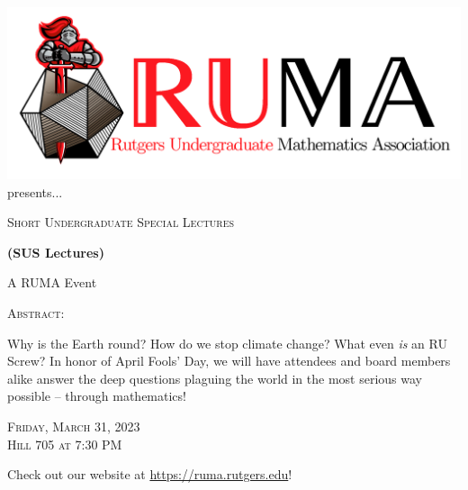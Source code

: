 \documentclass[12pt]{article}
\begin{document}

\begin{center}\includegraphics[scale=.4]{RUMAlogo.png}\\
\large  presents... \\

\vspace{1mm}
\begin{spacing}{1.5}

\begin{center}
	\textsc{\fontsize{32}{18}\selectfont Short Undergraduate Special Lectures}
\end{center}

\begin{center}
	\textbf{\fontsize{22}{18}\selectfont(SUS Lectures)}
\end{center}

\end{spacing}

{\fontsize{24}{18} \selectfont A RUMA Event}  

\normalsize

\vspace{10mm}

\textsc{Abstract:}


\LARGE
Why is the Earth round? How do we stop climate change? What even \textit{is} an RU Screw? In honor of April Fools' Day, we will have attendees and board members alike answer the deep questions plaguing the world in the most serious way possible -- through mathematics!

\vspace{2.5mm}

\begin{spacing}{1.25}
    {\fontsize{24}{28}\selectfont  \textsc{
        Friday, March 31, 2023 \\ Hill 705 at 7:30 PM}
    } 
\end{spacing}

\vspace{2.5mm}

\Large  Check out our website at 
\url{https://ruma.rutgers.edu}!
\end{center}
\end{document}
